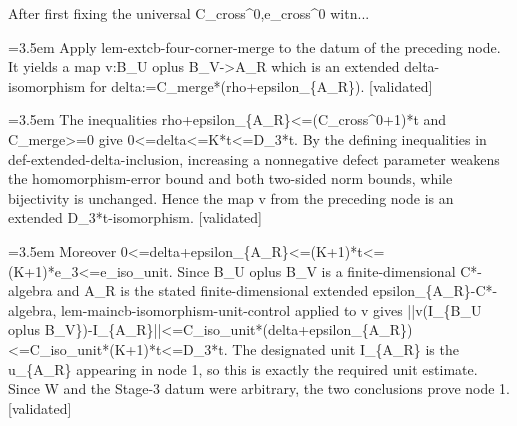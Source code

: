\documentclass{article}
\newcommand{\step}[1]{\par\noindent\hangindent=3.5em\hangafter=1%
  \makebox[3.5em][l]{\textbf{#1.}}}
\newcommand{\steptag}[1]{\hfill{\small\textsf{[#1]}}}
\begin{document}
\begin{proofbox}{After first fixing the universal C\_cross\textasciicircum{}0,e\_cross\textasciicircum{}0 witn...}
\step{1.3} Apply lem-extcb-four-corner-merge to the datum of the preceding node. It yields a map v:B\_U oplus B\_V->A\_R which is an extended delta-isomorphism for delta:=C\_merge*(rho+epsilon\_\{A\_R\}). \steptag{validated} \\[4pt]
\step{1.4} The inequalities rho+epsilon\_\{A\_R\}<=(C\_cross\textasciicircum{}0+1)*t and C\_merge>=0 give 0<=delta<=K*t<=D\_3*t. By the defining inequalities in def-extended-delta-inclusion, increasing a nonnegative defect parameter weakens the homomorphism-error bound and both two-sided norm bounds, while bijectivity is unchanged. Hence the map v from the preceding node is an extended D\_3*t-isomorphism. \steptag{validated} \\[4pt]
\step{1.5} Moreover 0<=delta+epsilon\_\{A\_R\}<=(K+1)*t<=(K+1)*e\_3<=e\_iso\_unit. Since B\_U oplus B\_V is a finite-dimensional C*-algebra and A\_R is the stated finite-dimensional extended epsilon\_\{A\_R\}-C*-algebra, lem-maincb-isomorphism-unit-control applied to v gives ||v(I\_\{B\_U oplus B\_V\})-I\_\{A\_R\}||<=C\_iso\_unit*(delta+epsilon\_\{A\_R\})<=C\_iso\_unit*(K+1)*t<=D\_3*t. The designated unit I\_\{A\_R\} is the u\_\{A\_R\} appearing in node 1, so this is exactly the required unit estimate. Since W and the Stage-3 datum were arbitrary, the two conclusions prove node 1. \steptag{validated} \\[4pt]
\end{proofbox}
\end{document}
